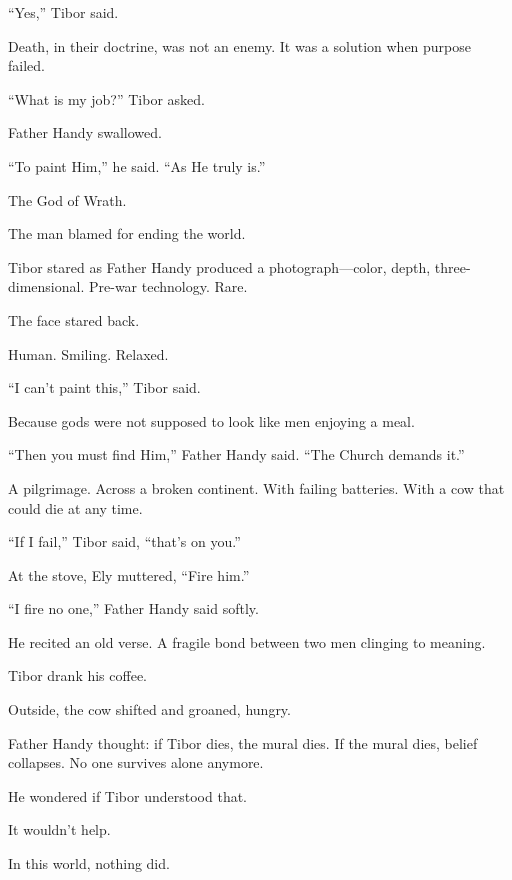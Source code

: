“Yes,” Tibor said.

Death, in their doctrine, was not an enemy. It was a solution when purpose failed.

“What is my job?” Tibor asked.

Father Handy swallowed.

“To paint Him,” he said. “As He truly is.”

The God of Wrath.

The man blamed for ending the world.

Tibor stared as Father Handy produced a photograph—color, depth, three-dimensional. Pre-war technology. Rare.

The face stared back.

Human. Smiling. Relaxed.

“I can’t paint this,” Tibor said.

Because gods were not supposed to look like men enjoying a meal.

“Then you must find Him,” Father Handy said. “The Church demands it.”

A pilgrimage. Across a broken continent. With failing batteries. With a cow that could die at any time.

“If I fail,” Tibor said, “that’s on you.”

At the stove, Ely muttered, “Fire him.”

“I fire no one,” Father Handy said softly.

He recited an old verse. A fragile bond between two men clinging to meaning.

Tibor drank his coffee.

Outside, the cow shifted and groaned, hungry.

Father Handy thought: if Tibor dies, the mural dies. If the mural dies, belief collapses. No one survives alone anymore.

He wondered if Tibor understood that.

It wouldn’t help.

In this world, nothing did.
